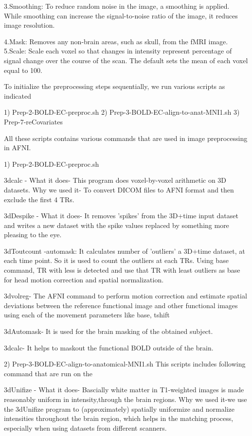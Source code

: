 \documentclass{article}
\begin{document}
3.Smoothing: To reduce random noise in the image, a smoothing is
applied. While smoothing can increase the signal-to-noise ratio of
the image, it reduces image resolution.


4.Mask: Removes any non-brain areas, such as skull, from
the fMRI image. 5.Scale: Scale each voxel so that changes in
intensity represent percentage of signal change over the course of the
scan. The default sets the mean of each voxel equal to 100.

To initialize the preprocessing steps sequentially, we run various
scripts as indicated

1) Prep-2-BOLD-EC-preproc.sh
2) Prep-3-BOLD-EC-align-to-anat-MNI1.sh
3) Prep-7-reCovariates

All these scripts contains various commands that are used in image
preprocessing in AFNI.

1) Prep-2-BOLD-EC-preproc.sh

3dcalc - What it does- This program does voxel-by-voxel arithmetic on
3D datasets. Why we used it- To convert DICOM files to AFNI format
and then exclude the first 4 TRs.

3dDespike - What it does- It removes 'spikes' from the 3D+time input
dataset and writes a new dataset with the spike values replaced by
something more pleasing to the eye.

3dToutcount -automask: It calculates number of 'outliers' a 3D+time
dataset, at each time point. So it is used to count the outliers at
each TRs. Using base command, TR with less is detected and use that TR
with least outliers as base for head motion correction and spatial
normalization.

3dvolreg- The AFNI command to perform motion correction and estimate
spatial deviations between the reference functional image and other
functional images using each of the movement parameters like base,
tshift

3dAutomask- It is used for the brain masking of the obtained subject.

3dcalc- It helps to maskout the functional BOLD outside of the brain.



2) Prep-3-BOLD-EC-align-to-anatomical-MNI1.sh This scripts includes
following command that are run on the

3dUnifize - What it does- Bascially white matter in T1-weighted images
is made reasonably uniform in intensity,through the brain regions.
Why we used it-we use the 3dUnifize program to (approximately)
spatially uniformize and normalize intensities throughout the brain
region, which helps in the matching process, especially when using
datasets from different scanners.
\end{document}

